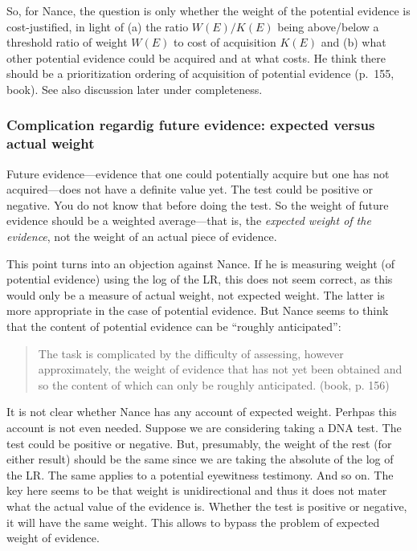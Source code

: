 \documentclass[
  10pt,
  dvipsnames,enabledeprecatedfontcommands]{scrartcl}
\begin{document}

So, for Nance, the question is only whether the weight of the potential
evidence is cost-justified, in light of (a) the ratio \(W(E)/K(E)\)
being above/below a threshold ratio of weight \(W(E)\) to cost of
acquisition \(K(E)\) and (b) what other potential evidence could be
acquired and at what costs. He think there should be a prioritization
ordering of acquisition of potential evidence (p.~155, book). See also
discussion later under completeness.

\hypertarget{complication-regardig-future-evidence-expected-versus-actual-weight}{%
\subsubsection{Complication regardig future evidence: expected versus
actual
weight}\label{complication-regardig-future-evidence-expected-versus-actual-weight}}

Future evidence---evidence that one could potentially acquire but one
has not acquired---does not have a definite value yet. The test could be
positive or negative. You do not know that before doing the test. So the
weight of future evidence should be a weighted average---that is, the
\textit{expected weight of the evidence}, not the weight of an actual
piece of evidence.

This point turns into an objection against Nance. If he is measuring
weight (of potential evidence) using the log of the LR, this does not
seem correct, as this would only be a measure of actual weight, not
expected weight. The latter is more appropriate in the case of potential
evidence. But Nance seems to think that the content of potential
evidence can be ``roughly anticipated'':

\begin{quote}
The task is complicated by the difficulty of assessing, however approximately, the weight of evidence that has not yet been obtained and so the content of which can only be roughly anticipated. (book, p. 156)
\end{quote}

It is not clear whether Nance has any account of expected weight.
Perhpas this account is not even needed. Suppose we are considering
taking a DNA test. The test could be positive or negative. But,
presumably, the weight of the rest (for either result) should be the
same since we are taking the absolute of the log of the LR. The same
applies to a potential eyewitness testimony. And so on. The key here
seems to be that weight is unidirectional and thus it does not mater
what the actual value of the evidence is. Whether the test is positive
or negative, it will have the same weight. This allows to bypass the
problem of expected weight of evidence.
\end{document}
